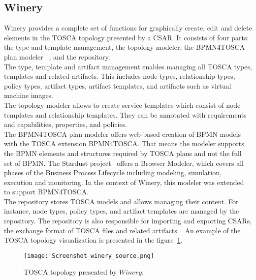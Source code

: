 \subsection*{Winery}\label{subs:wine}\label{tool:winery}
Winery provides a complete set of functions for graphically create, edit and delete elements in the TOSCA topology presented by a CSAR. 
It consists of four parts: the type and template management, the topology modeler, the BPMN4TOSCA plan modeler ~\cite{BPMN4TOSCA}, and the repository.\\
The type, template and artifact management enables managing all TOSCA types, templates and related artifacts. 
This includes node types, relationship types, policy types, artifact types, artifact templates, and artifacts such as virtual machine images.\\
The topology modeler allows to create service templates which consist of node templates and relationship templates. 
They can be annotated with requirements and capabilities, properties, and policies.\\
The BPMN4TOSCA plan modeler offers web-based creation of BPMN models with the TOSCA extension BPMN4TOSCA. 
That means the modeler supports the BPMN elements and structures required by TOSCA plans and not the full set of BPMN. 
The Stardust project~\cite*{stardust} offers a Browser Modeler, which covers all phases of the Business Process Lifecycle including modeling, simulation, execution and monitoring. 
In the context of Winery, this modeler was extended to support BPMN4TOSCA.\\
The repository stores TOSCA models and allows managing their content. 
For instance, node types, policy types, and artifact templates are managed by the repository. 
The repository is also responsible for importing and exporting CSARs, the exchange format of TOSCA files and related artifacts.~\cite{winery} %
An example of the TOSCA topology visualization is presented in the figure~\ref{fig:winery_source}.
\begin{figure}[ht]   
\centering
\texttt{[image: Screenshot\_winery\_source.png]}
\caption{TOSCA topology presented by $Winery$.}
\label{fig:winery_source}
\end{figure}


